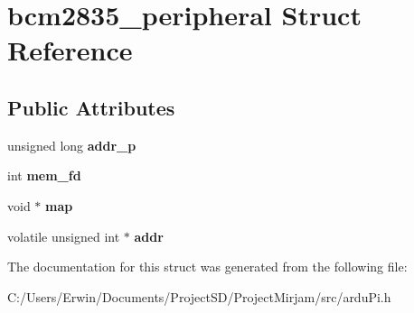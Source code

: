 \hypertarget{structbcm2835__peripheral}{}\section{bcm2835\+\_\+peripheral Struct Reference}
\label{structbcm2835__peripheral}
\subsection*{Public Attributes}
\begin{DoxyCompactItemize}
\item 
\hypertarget{structbcm2835__peripheral_a972e542acd3ccb0b9a5f73aa75251b57}{}unsigned long {\bfseries addr\+\_\+p}\label{structbcm2835__peripheral_a972e542acd3ccb0b9a5f73aa75251b57}

\item 
\hypertarget{structbcm2835__peripheral_a141406ce70084a329a865ac2e73db2f3}{}int {\bfseries mem\+\_\+fd}\label{structbcm2835__peripheral_a141406ce70084a329a865ac2e73db2f3}

\item 
\hypertarget{structbcm2835__peripheral_a8ce91c13928c404b67e1990bf4a5018b}{}void $\ast$ {\bfseries map}\label{structbcm2835__peripheral_a8ce91c13928c404b67e1990bf4a5018b}

\item 
\hypertarget{structbcm2835__peripheral_ac33828b1b9863498b33058a4ca2985dc}{}volatile unsigned int $\ast$ {\bfseries addr}\label{structbcm2835__peripheral_ac33828b1b9863498b33058a4ca2985dc}

\end{DoxyCompactItemize}


The documentation for this struct was generated from the following file\+:\begin{DoxyCompactItemize}
\item 
C\+:/\+Users/\+Erwin/\+Documents/\+Project\+S\+D/\+Project\+Mirjam/src/ardu\+Pi.\+h\end{DoxyCompactItemize}
